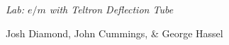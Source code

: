 {\LARGE {\em \noindent Lab: $e/m$ with Teltron Deflection Tube}}

\large{\noindent Josh Diamond,  John Cummings, \& George Hassel}

